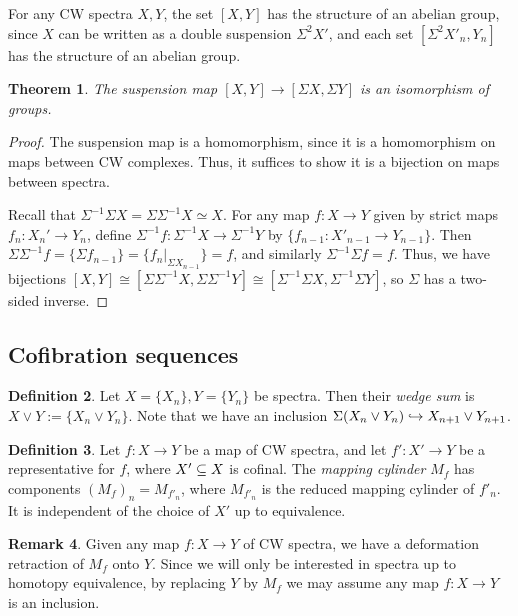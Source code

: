 \documentclass[11pt, titlepage]{article} %
\def\subq{\ensuremath\subseteq}
\def\inj{\ensuremath\hookrightarrow}
\numberwithin{equation}{subsection}
\theoremstyle{plain}
\newtheorem{theorem}{Theorem}[subsection]
\theoremstyle{definition}
\newtheorem{definition}[theorem]{Definition}
\newtheorem{remark}[theorem]{Remark}
\begin{document}
For any CW spectra \(X,Y\), the set \([X,Y]\) has the structure of an abelian group, since \(X\) can be written as a double suspension \(\Sigma^2X'\), and each set \([\Sigma^2X'_n, Y_n]\) has the structure of an abelian group. %

\begin{theorem}\label{2504151310}
The suspension map \([X,Y]\to [\Sigma X, \Sigma Y]\) is an isomorphism of groups.
\end{theorem}

\begin{proof}
The suspension map is a homomorphism, since it is a homomorphism on maps between CW complexes. Thus, it suffices to show it is a bijection on maps between spectra. 

Recall that \(\Sigma^{-1}\Sigma X=\Sigma\Sigma^{-1}X\simeq X\). For any map \(f : X \to Y\) given by strict maps \(f_n : X_n'\to Y_n\), define \(\Sigma^{-1}f : \Sigma^{-1}X \to \Sigma^{-1}Y\) by \(\{f_{n-1} : X'_{n-1}\to Y_{n-1}\}\). Then \(\Sigma\Sigma^{-1}f=\{\Sigma f_{n-1}\}=\{f_n|_{\Sigma X_{n-1}}\}=f\), and similarly \(\Sigma^{-1}\Sigma f =f\). Thus, we have bijections \([X,Y]\cong [\Sigma\Sigma^{-1}X, \Sigma\Sigma^{-1}Y]\cong [\Sigma^{-1}\Sigma X, \Sigma^{-1}\Sigma Y]\), so \(\Sigma\) has a two-sided inverse.
\end{proof}

\subsection{Cofibration sequences}\label{2503291211}

\begin{definition}
Let \(X=\{X_n\}, Y=\{Y_n\}\) be spectra. Then their \textit{wedge sum} is \(X\vee Y :=\{X_n \vee Y_n\}\). Note that %
we have an inclusion \(\Sigma(X_n\vee Y_n)\inj X_{n+1}\vee Y_{n+1}\). 
\end{definition}

\begin{definition}
Let \(f : X \to Y\) be a map of CW spectra, and let \(f' : X' \to Y\) be a representative for \(f\), where \(X'\subq X\) is cofinal. The \textit{mapping cylinder} \(M_f\) has components \((M_f)_n=M_{f'_n}\), where \(M_{f'_n}\) is the reduced mapping cylinder of \(f'_n\). It is independent of the choice of \(X'\) up to equivalence.
\end{definition}

\begin{remark}\label{2504231152}
Given any map \(f : X \to Y\) of CW spectra, we have a deformation retraction of \(M_f\) onto \(Y\). Since we will only be interested in spectra up to homotopy equivalence, by replacing \(Y\) by \(M_f\) we may assume any map \(f : X \to Y\) is an inclusion. 
\end{remark}
\end{document}
